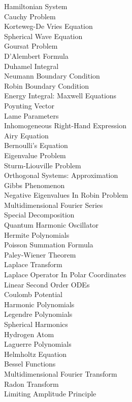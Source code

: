 Hamiltonian System \\
Cauchy Problem \\
Korteweg-De Vries Equation \\
Spherical Wave Equation \\
Goursat Problem \\
D'Alembert Formula \\
Duhamel Integral \\
Neumann Boundary Condition \\
Robin Boundary Condition \\
Energy Integral: Maxwell Equations \\
Poynting Vector \\
Lame Parameters \\
Inhomogeneous Right-Hand Expression \\
Airy Equation \\
Bernoulli's Equation \\
Eigenvalue Problem \\
Sturm-Liouville Problem \\
Orthogonal Systems: Approximation \\
Gibbs Phenomenon \\
Negative Eigenvalues In Robin Problem \\
Multidimensional Fourier Series \\
Special Decomposition \\
Quantum Harmonic Oscillator \\
Hermite Polynomials \\
Poisson Summation Formula \\
Paley-Wiener Theorem \\
Laplace Transform \\
Laplace Operator In Polar Coordinates \\
Linear Second Order ODEs \\
Coulomb Potential \\
Harmonic Polynomials \\
Legendre Polynomials \\
Spherical Harmonics \\
Hydrogen Atom \\
Laguerre Polynomials \\
Helmholtz Equation \\
Bessel Functions \\
Multidimensional Fourier Transform \\
Radon Transform \\
Limiting Amplitude Principle \\
